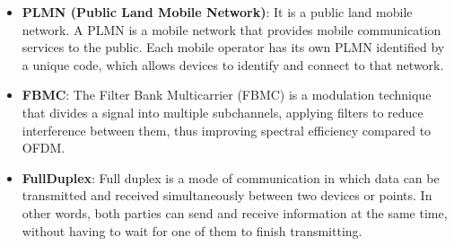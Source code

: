 \documentclass[english]{article}
\begin{document}
\begin{itemize}

	\item \textbf{\hypertarget{PLMN}{PLMN (Public Land Mobile Network)}}:
	      It is a public land mobile network. A PLMN is a mobile network that provides mobile
	      communication services to the public. Each mobile operator has its own PLMN identified
	      by a unique code, which allows devices to identify and connect to that network.

	\item \textbf{FBMC}\hypertarget{FBMC}{}:
	      The Filter Bank Multicarrier (FBMC) is a modulation
	      technique that divides a signal into multiple subchannels, applying filters to reduce
	      interference between them, thus improving spectral efficiency compared to OFDM.\@

	\item \textbf{FullDuplex}\hypertarget{FullDuplex}{}:
	      Full duplex is a mode of communication in which data can be transmitted and
	      received simultaneously between two devices or points. In other words,
	      both parties can send and receive information at the same time, without
	      having to wait for one of them to finish transmitting.


\end{itemize}
\end{document}
